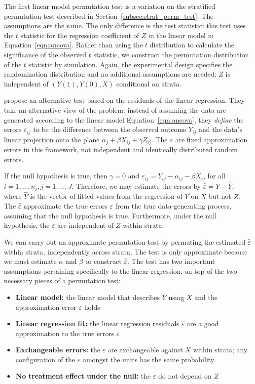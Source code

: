\documentclass[12pt]{article}
\begin{document}
The first linear model permutation test is a variation on the stratified permutation test described in Section~\ref{subsec:strat_perm_test}.
The assumptions are the same.
The only difference is the test statistic:
this test uses the $t$ statistic for the regression coefficient of $Z$ in the linear model in Equation~\ref{eqn:ancova}.
Rather than using the $t$ distribution to calculate the significance of the observed $t$ statistic, we construct the permutation distribution of the $t$ statistic by simulation.
Again, the experimental design specifies the randomization distribution and no additional assumptions are needed:
$Z$ is independent of $(Y(1), Y(0), X)$ conditional on strata.

\citet{freedman_nonstochastic_1983} propose an alternative test based on the residuals of the linear regression.
They take an alternative view of the problem:
instead of assuming the data are generated according to the linear model Equation~\ref{eqn:ancova}, they \textit{define} the errors $\varepsilon_{ij}$ to be the difference between the observed outcome $Y_{ij}$ and the data's linear projection onto the plane $\alpha_j + \beta X_{ij}+ \gamma Z_{ij}$.
The $\varepsilon$ are fixed approximation errors in this framework, not independent and identically distributed random errors.

If the null hypothesis is true, then $\gamma = 0$ and $\varepsilon_{ij} = Y_{ij} - \alpha_{ij} - \beta X_{ij}$ for all $i = 1, \dots, n_j, j = 1, \dots, J$.
Therefore, we may estimate the errors by $\hat{\varepsilon} =Y - \hat{Y}$, where $\hat{Y}$ is the vector of fitted values from the regression of $Y$ on $X$ but not $Z$.
The $\hat{\varepsilon}$ approximate the true errors $\varepsilon$ from the true data-generating process, assuming that the null hypothesis is true.
Furthermore, under the null hypothesis, the $\varepsilon$ are independent of $Z$ within strata. 

We can carry out an approximate permutation test by permuting the estimated $\hat{\varepsilon}$ within strata, independently across strata.
The test is only approximate because we must estimate $\alpha$ and $\beta$ to construct $\hat{\varepsilon}$.
The test has two important assumptions pertaining specifically to the linear regression, on top of the two necessary pieces of a permutation test:
\begin{itemize}
\item \textbf{Linear model:} the linear model that describes $Y$ using $X$ and the approximation error $\varepsilon$ holds
\item \textbf{Linear regression fit:} the linear regression residuals $\hat{\varepsilon}$ are a good approximation to the true errors $\varepsilon$ 
\item \textbf{Exchangeable errors:} the $\varepsilon$ are exchangeable against $X$ within strata; any configuration of the $\varepsilon$ amongst the units has the same probability
\item \textbf{No treatment effect under the null:} the $\varepsilon$ do not depend on $Z$
\end{itemize}
\end{document}
